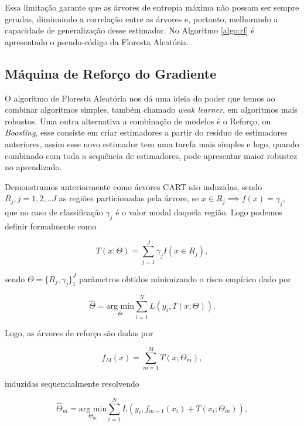 Essa limitação garante que as árvores de entropia máxima não possam ser sempre
geradas, diminuindo a correlação entre as árvores e, portanto, melhorando a
capacidade de generalização desse estimador. No Algoritmo \ref{algo:rf} é
apresentado o pseudo-código da Floresta Aleatória.

\subsection{Máquina de Reforço do Gradiente}

O algoritmo de Floresta Aleatória nos dá uma ideia do poder que temos ao
combinar algoritmos simples, também chamado \textit{weak learner}, em
algoritmos mais robustos. Uma outra alternativa a combinação de modelos é o
Reforço, ou \textit{Boosting}, esse consiste em criar estimadores a partir do
resíduo de estimadores anteriores, assim esse novo estimador tem uma tarefa
mais simples e logo, quando combinado com toda a sequência de estimadores, pode
apresentar maior robustez no aprendizado.

Demonstramos anteriormente como árvores CART são induzidas, sendo $R_j,j=1,2,..J$ as regiões particionadas pela árvore, se $x \in R_j \implies f(x) = \gamma_j$, que no caso de classificação $\gamma_j$ é o valor modal daquela região. Logo podemos definir formalmente como

\begin{equation}
    T(x;\Theta) = \sum_{j=1}^J \gamma_j I(x \in R_j),
\end{equation}

sendo $\Theta = \{R_j,\gamma_j\}_1^J$ parâmetros obtidos minimizando o risco empírico dado por

\begin{equation}
    \hat{\Theta} = \underset{\Theta}{\text{arg min}}
    \sum_{i=1}^N L(y_i,T(x;\Theta)).
\end{equation}

Logo, as árvores de reforço são dadas por

\begin{equation}
\label{eq:tree_boost}
    f_M(x) = \sum_{m=1}^M T(x;\Theta_m),
\end{equation}

induzidas sequencialmente resolvendo

\begin{equation}
    \hat{\Theta}_m = \underset{\Theta_m}{\text{arg min}}
    \sum_{i=1}^N L(y_i,f_{m-1}(x_i)+T(x_i;\Theta_m)),
\end{equation}

